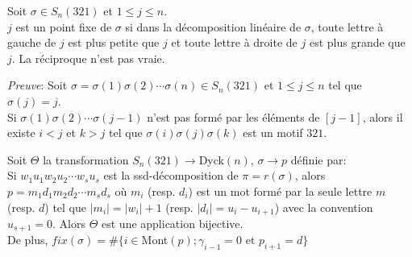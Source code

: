 \begin{lemme} \label{jPtFix}
	Soit $\sigma \in S_{n}(321)$ et $1\leq j \leq n$.\\ $j$ est un point fixe de $\sigma$ si dans la décomposition linéaire de $\sigma$, toute lettre à gauche de $j$ est plus petite que $j$ et toute lettre à droite de $j$ est plus grande que $j$. La réciproque n'est pas vraie.
\end{lemme}
\textit{Preuve}:
Soit $\sigma = \sigma(1)\sigma(2)\cdots \sigma(n) \in S_{n}(321)$ et $1\leq j \leq n$ tel que $\sigma(j)=j$.\\
Si $\sigma(1)\sigma(2)\cdots \sigma(j-1)$ n'est pas formé par les éléments de $[j-1]$, alors il existe $i<j$ et $k>j$ tel que $\sigma(i)\sigma(j)\sigma(k)$ est un motif $321$.\vspace{5pt}\\

\begin{proposition} \label{dyck_to_avoiding_321_tfsm}
	Soit $\Theta$ la transformation $S_{n}(321)\longrightarrow $\rm{Dyck}$(n)$, $\sigma \longrightarrow p$ définie par:\\
	Si $w_{1}u_{1}w_{2}u_2 \cdots w_{s}u_{s}$ est la ssd-décomposition de $\pi=r(\sigma)$, alors $p=m_{1}d_{1}m_{2}d_{2}\cdots m_{s}d_{s}$ où $m_{i}$ (resp. $d_{i}$) est un mot formé par la seule lettre $m$ (resp. $d$) tel que $|m_{i}| = |w_{i}|+1$ (resp. $|d_{i}| = u_{i}-u_{i+1}$) avec la convention $u_{s+1}=0$. Alors $\Theta$ est une application bijective.\\
	De plus, $fix(\sigma)= \#\{i \in $\rm{Mont}$(p); \gamma_{i-1}=0 \text{ et } p_{i+1}=d\}$
\end{proposition}


